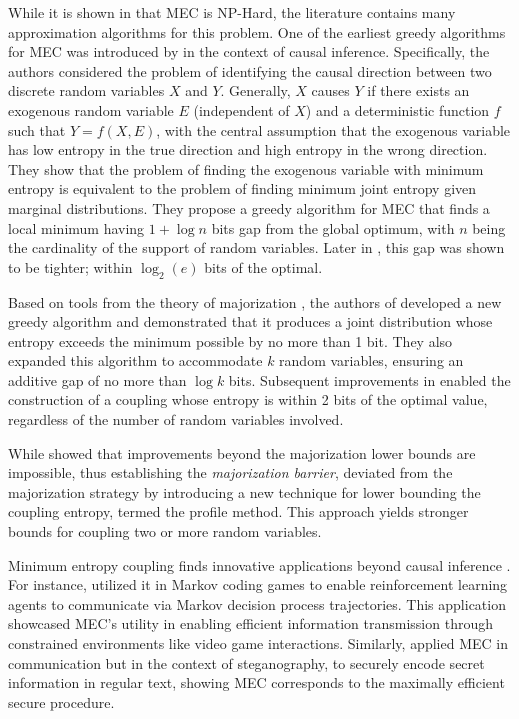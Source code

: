While it is shown in \cite{vidyasagar2012metric, kovavcevic2015entropy} that MEC is NP-Hard, the literature contains many approximation algorithms for this problem. One of the earliest greedy algorithms for MEC was introduced by \cite{kocaoglu2017entropic} in the context of causal inference. Specifically, the authors considered the problem of identifying the causal direction between two discrete random variables $X$ and $Y$. Generally, $X$ causes $Y$ if there exists an exogenous random variable $E$ (independent of $X$) and a deterministic function $f$ such that $Y = f (X,E)$, with the central assumption that the exogenous variable has low entropy in the true direction and high entropy in the wrong direction. They show that the problem of finding the exogenous variable with minimum entropy is equivalent to the problem of finding minimum joint entropy given marginal distributions. They propose a greedy algorithm for MEC that finds a local minimum having $1 + \log n$ bits gap from the global optimum, with $n$ being the cardinality of the support of random variables. Later in \cite{compton2022tighter}, this gap was shown to be tighter; within $\log_2(e)$ bits of the optimal.

Based on tools from the theory of majorization \cite{marshall1979inequalities}, the authors of \cite{cicalese2019minimum} developed a new greedy algorithm and demonstrated that it produces a joint distribution whose entropy exceeds the minimum possible by no more than 1 bit. They also expanded this algorithm to accommodate $k$ random variables, ensuring an additive gap of no more than $\log k$ bits. Subsequent improvements in \cite{li2021efficient} enabled the construction of a coupling whose entropy is within 2 bits of the optimal value, regardless of the number of random variables involved.

While \cite{compton2022tighter} showed that improvements beyond the majorization lower bounds are impossible, thus establishing the \textit{majorization barrier}, \cite{compton2023minimum} deviated from the majorization strategy by introducing a new technique for lower bounding the coupling entropy, termed the profile method. This approach yields stronger bounds for coupling two or more random variables.

Minimum entropy coupling finds innovative applications beyond causal inference \cite{kocaoglu2017entropic, compton2020entropic, javidian2021quantum}. For instance, \cite{sokota2022communicating} utilized it in Markov coding games to enable reinforcement learning agents to communicate via Markov decision process trajectories. This application showcased MEC's utility in enabling efficient information transmission through constrained environments like video game interactions. Similarly, \cite{de2022perfectly} applied MEC in communication but in the context of steganography, to securely encode secret information in regular text, showing MEC corresponds to the maximally efficient secure procedure.

